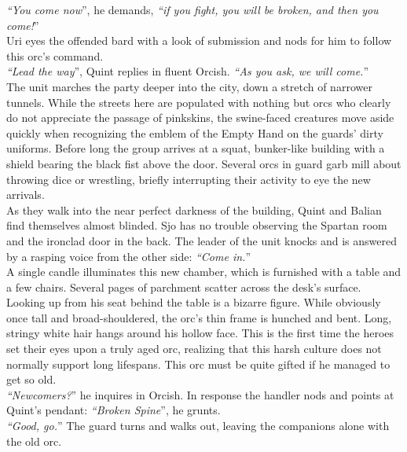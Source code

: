 {\itshape``You come now}'', he demands, {\itshape``if you fight, you will be broken, and then you come!}''\\

Uri eyes the offended bard with a look of submission and nods for him to follow this orc's command.\\

{\itshape``Lead the way}'', Quint replies in fluent Orcish. {\itshape``As you ask, we will come.}''\\

The unit marches the party deeper into the city, down a stretch of narrower tunnels. While the streets here are populated with nothing but orcs who clearly do not appreciate the passage of pinkskins, the swine-faced creatures move aside quickly when recognizing the emblem of the Empty Hand on the guards' dirty uniforms. Before long the group arrives at a squat, bunker-like building with a shield bearing the black fist above the door. Several orcs in guard garb mill about throwing dice or wrestling, briefly interrupting their activity to eye the new arrivals.\\

As they walk into the near perfect darkness of the building, Quint and Balian find themselves almost blinded. Sjo has no trouble observing the Spartan room and the ironclad door in the back. The leader of the unit knocks and is answered by a rasping voice from the other side: {\itshape``Come in.}''\\

A single candle illuminates this new chamber, which is furnished with a table and a few chairs. Several pages of parchment scatter across the desk's surface. Looking up from his seat behind the table is a bizarre figure. While obviously once tall and broad-shouldered, the orc's thin frame is hunched and bent. Long, stringy white hair hangs around his hollow face. This is the first time the heroes set their eyes upon a truly aged orc, realizing that this harsh culture does not normally support long lifespans. This orc must be quite gifted if he managed to get so old.\\

{\itshape``Newcomers?}'' he inquires in Orcish. In response the handler nods and points at Quint's pendant: {\itshape``Broken Spine}'', he grunts.\\

{\itshape``Good, go.}'' The guard turns and walks out, leaving the companions alone with the old orc.\\

